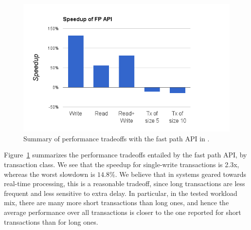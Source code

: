 \begin{figure}[h]
\includegraphics[width=.5\textwidth]{figs/speedup.png}
\caption{Summary of performance tradeoffs with the fast path API in {\sys}.}
\label{fig:fp-tradeoff}
\end{figure}


Figure~\ref{fig:fp-tradeoff} summarizes the performance tradeoffs entailed by the fast path API, by transaction class. 
We see that the speedup for single-write transactions is 2.3x, whereas the worst slowdown is $14.8\%$. 
We believe that in systems geared towards real-time processing, this is a reasonable tradeoff, since long transactions 
are less frequent and less sensitive to extra delay.
In particular, in the tested workload mix, there are many more short transactions than long ones, and hence the average
performance over all transactions is closer to the one reported for short transactions than for long ones.  
